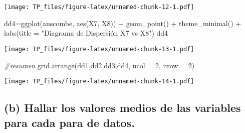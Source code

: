 \documentclass[
]{article}
\newenvironment{Shaded}{\begin{snugshade}}{\end{snugshade}}
\newcommand{\AttributeTok}[1]{\textcolor[rgb]{0.77,0.63,0.00}{#1}}
\newcommand{\CommentTok}[1]{\textcolor[rgb]{0.56,0.35,0.01}{\textit{#1}}}
\newcommand{\DecValTok}[1]{\textcolor[rgb]{0.00,0.00,0.81}{#1}}
\newcommand{\FunctionTok}[1]{\textcolor[rgb]{0.00,0.00,0.00}{#1}}
\newcommand{\NormalTok}[1]{#1}
\newcommand{\OtherTok}[1]{\textcolor[rgb]{0.56,0.35,0.01}{#1}}
\newcommand{\SpecialCharTok}[1]{\textcolor[rgb]{0.00,0.00,0.00}{#1}}
\newcommand{\StringTok}[1]{\textcolor[rgb]{0.31,0.60,0.02}{#1}}
\begin{document}
\texttt{[image: TP\_files/figure-latex/unnamed-chunk-12-1.pdf]}

\begin{Shaded}
\begin{Highlighting}[]
\NormalTok{dd4}\OtherTok{=}\FunctionTok{ggplot}\NormalTok{(anscombe, }\FunctionTok{aes}\NormalTok{(X7, X8)) }\SpecialCharTok{+} 
  \FunctionTok{geom\_point}\NormalTok{() }\SpecialCharTok{+} \FunctionTok{theme\_minimal}\NormalTok{() }\SpecialCharTok{+} \FunctionTok{labs}\NormalTok{(}\AttributeTok{title =} \StringTok{"Diagrama de Dispersión X7 vs X8"}\NormalTok{)}
\NormalTok{dd4}
\end{Highlighting}
\end{Shaded}

\texttt{[image: TP\_files/figure-latex/unnamed-chunk-13-1.pdf]}

\begin{Shaded}
\begin{Highlighting}[]
\CommentTok{\#resumen}
\FunctionTok{grid.arrange}\NormalTok{(dd1,dd2,dd3,dd4, }\AttributeTok{ncol =} \DecValTok{2}\NormalTok{, }\AttributeTok{nrow =} \DecValTok{2}\NormalTok{)}
\end{Highlighting}
\end{Shaded}

\texttt{[image: TP\_files/figure-latex/unnamed-chunk-14-1.pdf]}

\hypertarget{b-hallar-los-valores-medios-de-las-variables-para-cada-para-de-datos.}{%
\subsection{(b) Hallar los valores medios de las variables para cada
para de
datos.}\label{b-hallar-los-valores-medios-de-las-variables-para-cada-para-de-datos.}}
\end{document}

